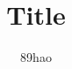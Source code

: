 \documentclass[a4paper]{article}
\begin{document}
\title{Title}
\author{89hao}
\maketitle
\tableofcontents
\end{document}

